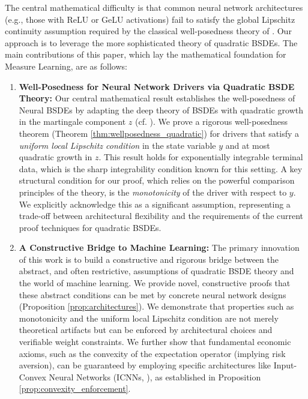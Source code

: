 \documentclass[qian]{imsart}
\theoremstyle{plain}
\theoremstyle{definition}
\begin{document}
The central mathematical difficulty is that common neural network architectures (e.g., those with ReLU or GeLU activations) fail to satisfy the global Lipschitz continuity assumption required by the classical well-posedness theory of \cite{PardouxPeng1990}. Our approach is to leverage the more sophisticated theory of quadratic BSDEs. The main contributions of this paper, which lay the mathematical foundation for Measure Learning, are as follows:

\begin{enumerate}[label=(\roman*)]
    \item \textbf{Well-Posedness for Neural Network Drivers via Quadratic BSDE Theory:} Our central mathematical result establishes the well-posedness of Neural BSDEs by adapting the deep theory of BSDEs with quadratic growth in the martingale component $z$ (cf. \cite{Kobylanski2000}). We prove a rigorous well-posedness theorem (Theorem \ref{thm:wellposedness_quadratic}) for drivers that satisfy a \textit{uniform local Lipschitz condition} in the state variable $y$ and at most quadratic growth in $z$. This result holds for exponentially integrable terminal data, which is the sharp integrability condition known for this setting. A key structural condition for our proof, which relies on the powerful comparison principles of the theory, is the \textit{monotonicity} of the driver with respect to $y$. We explicitly acknowledge this as a significant assumption, representing a trade-off between architectural flexibility and the requirements of the current proof techniques for quadratic BSDEs.

    \item \textbf{A Constructive Bridge to Machine Learning:} The primary innovation of this work is to build a constructive and rigorous bridge between the abstract, and often restrictive, assumptions of quadratic BSDE theory and the world of machine learning. We provide novel, constructive proofs that these abstract conditions can be met by concrete neural network designs (Proposition \ref{prop:architectures}). We demonstrate that properties such as monotonicity and the uniform local Lipschitz condition are not merely theoretical artifacts but can be enforced by architectural choices and verifiable weight constraints. We further show that fundamental economic axioms, such as the convexity of the expectation operator (implying risk aversion), can be guaranteed by employing specific architectures like Input-Convex Neural Networks (ICNNs, \cite{AmosEtAl2017ICNN}), as established in Proposition \ref{prop:convexity_enforcement}.


\end{enumerate}
\end{document}
